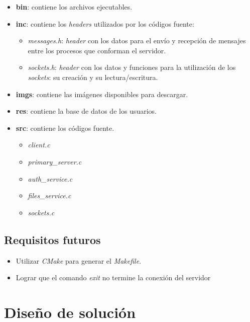 \documentclass[12pt,a4paper]{article}
\begin{document}
\begin{itemize}[leftmargin=1.5cm]
  \item \textbf{bin}: contiene los archivos ejecutables.
  \item \textbf{inc}: contiene los \emph{headers} utilizados por los
  códigos fuente:

  \begin{itemize}[leftmargin=1cm, nosep]
    \item \emph{messages.h}: \emph{header} con los datos para el
    envío y recepción de mensajes entre los procesos que conforman
    el servidor.
    \item \emph{sockets.h}: \emph{header} con los datos y funciones
    para la utilización de los \emph{sockets}: su creación y su
    lectura/escritura.
  \end{itemize}

  \item \textbf{imgs}: contiene las imágenes disponibles para descargar.
  \item \textbf{res}: contiene la base de datos de los usuarios.
  \item \textbf{src}: contiene los códigos fuente.

  \begin{itemize}[leftmargin=1cm, nosep]
    \item \emph{client.c}
    \item \emph{primary\_server.c}
    \item \emph{auth\_service.c}
    \item \emph{files\_service.c}
    \item \emph{sockets.c}
  \end{itemize}

\end{itemize}

\subsection{Requisitos futuros}
\label{futurereq}

\begin{itemize}[leftmargin=1.5cm]
  \item Utilizar \emph{CMake} para generar el \emph{Makefile}.
  \item Lograr que el comando \emph{exit} no termine la conexión del servidor
\end{itemize}

\section{Diseño de solución}
\label{solucion}
\end{document}
